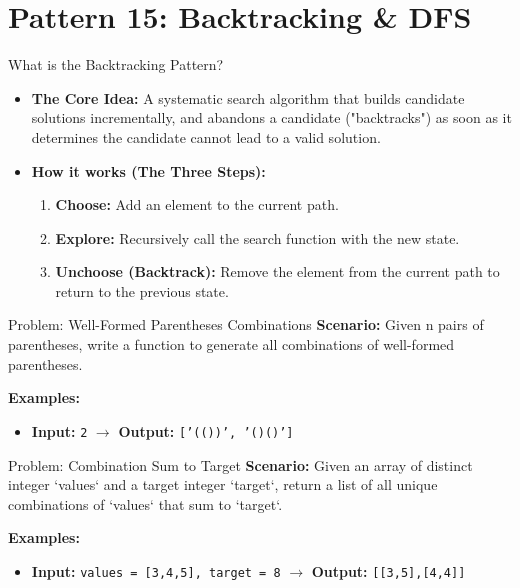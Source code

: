 \section{Pattern 15: Backtracking \& DFS}

\begin{frame}[c]{\empty}
    \begin{center}
        \Large\textbf{\secname}
    \end{center}
\end{frame}

\begin{frame}{What is the Backtracking Pattern?}
  \begin{itemize}
    \item \textbf{The Core Idea:} A systematic search algorithm that builds candidate solutions incrementally, and abandons a candidate ("backtracks") as soon as it determines the candidate cannot lead to a valid solution.
    \item \textbf{How it works (The Three Steps):}
      \begin{enumerate}
        \item \textbf{Choose:} Add an element to the current path.
        \item \textbf{Explore:} Recursively call the search function with the new state.
        \item \textbf{Unchoose (Backtrack):} Remove the element from the current path to return to the previous state.
      \end{enumerate}
  \end{itemize}
\end{frame}

\begin{frame}[fragile]{Problem: Well-Formed Parentheses Combinations}
  \textbf{Scenario:}
  Given n pairs of parentheses, write a function to generate all combinations of well-formed parentheses.
  
  \vspace{0.3cm}
  \textbf{Examples:}
  \begin{itemize}
    \item \textbf{Input:} \texttt{2} $\rightarrow$ \textbf{Output:} \texttt{['(())', '()()']}
  \end{itemize}
\end{frame}

\begin{frame}[fragile]{Problem: Combination Sum to Target}
  \textbf{Scenario:}
  Given an array of distinct integer `values` and a target integer `target`, return a list of all unique combinations of `values` that sum to `target`.
  
  \vspace{0.3cm}
  \textbf{Examples:}
  \begin{itemize}
    \item \textbf{Input:} \texttt{values = [3,4,5], target = 8} $\rightarrow$ \textbf{Output:} \texttt{[[3,5],[4,4]]}
  \end{itemize}
\end{frame}

